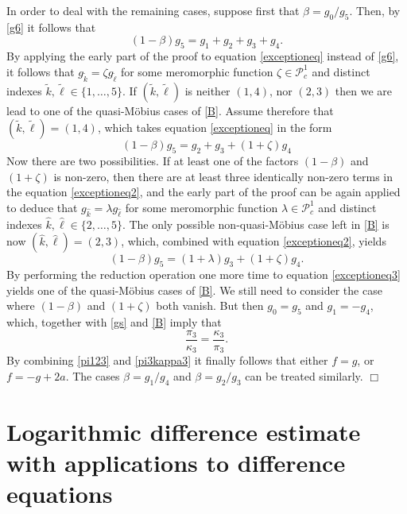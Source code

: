 \documentclass{amsart}
\theoremstyle{definition}
\numberwithin{equation}{section}
\numberwithin{theorem}{section}
\begin{document}
In order to deal with the remaining
cases, suppose first that $\beta=g_0/g_5$. Then, by \eqref{g6} it
follows that
    \begin{equation}\label{exceptioneq}
    (1-\beta)g_5=g_1+g_2+g_3+g_4.
    \end{equation}
By applying the early part of the proof to equation
\eqref{exceptioneq} instead of \eqref{g6}, it follows that
$g_{\tilde k}=\zeta g_{\tilde\ell}$ for some meromorphic function
$\zeta\in\mathcal{P}^1_c$ and distinct indexes $\tilde
k,\tilde\ell\in\{1,\ldots,5\}$. If $(\tilde k,\tilde\ell)$ is
neither $(1,4)$, nor $(2,3)$ then we are lead to one of the
quasi-M\"obius cases of \eqref{B}. Assume therefore that $(\tilde
k,\tilde\ell)=(1,4)$, which takes equation \eqref{exceptioneq} in
the form
    \begin{equation}\label{exceptioneq2}
    (1-\beta)g_5=g_2+g_3+(1+\zeta)g_4
    \end{equation}
Now there are two possibilities. If at least one of the factors
$(1-\beta)$ and $(1+\zeta)$ is non-zero, then there are at least
three identically non-zero terms in the equation
\eqref{exceptioneq2}, and the early part of the proof can be again
applied to deduce that $g_{\hat k}=\lambda g_{\hat\ell}$ for some
meromorphic function $\lambda\in\mathcal{P}^1_c$ and distinct indexes
$\hat k,\hat\ell\in\{2,\ldots,5\}$. The only possible
non-quasi-M\"obius case left in \eqref{B} is now $(\hat
k,\hat\ell)=(2,3)$, which, combined with equation
\eqref{exceptioneq2}, yields
    \begin{equation}\label{exceptioneq3}
    (1-\beta)g_5=(1+\lambda)g_3+(1+\zeta)g_4.
    \end{equation}
By performing the reduction operation one more time to equation
\eqref{exceptioneq3} yields one of the quasi-M\"obius cases of
\eqref{B}. We still need to consider the case where $(1-\beta)$ and
$(1+\zeta)$ both vanish. But then $g_0= g_5$ and $g_1=-g_4$,
which, together with \eqref{gs} and \eqref{B} imply that
    \begin{equation}\label{pi3kappa3}
    \frac{\pi_3}{\kappa_3}=\frac{\kappa_3}{\pi_3}.
    \end{equation}
By combining \eqref{pi123} and \eqref{pi3kappa3} it finally
follows that either $f=g$, or $f=-g+2a$. The cases $\beta=g_1/g_4$ and $\beta=g_2/g_3$ can be treated similarly. \hfill$\Box$



\section{Logarithmic difference estimate with applications to difference equations}\label{logdesec}
\end{document}
